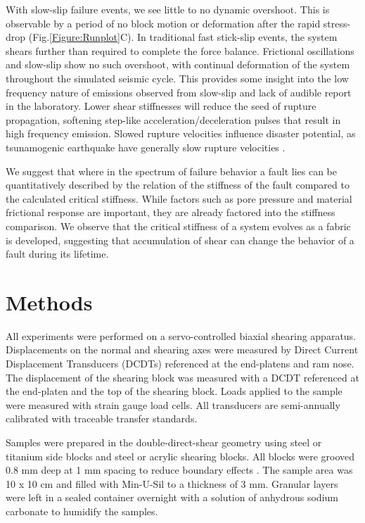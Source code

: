 \documentclass[11pt]{article}
\begin{document}
With slow-slip failure events, we see little to no dynamic overshoot. This is observable by a period of no block motion or
deformation after the rapid stress-drop (Fig.\ref{Figure:Runplot}C).  In
traditional fast stick-slip events, the system shears further than required to
complete the force balance. Frictional oscillations and slow-slip
show no such overshoot, with continual deformation of the system throughout the
simulated seismic cycle. This provides some insight into the low frequency
nature of emissions observed from slow-slip and lack of audible report in the
laboratory. Lower shear stiffnesses will reduce the seed of rupture propagation,
softening step-like acceleration/deceleration pulses that result in high
frequency emission. Slowed rupture velocities influence disaster potential, as
tsunamogenic earthquake have generally slow rupture velocities
\cite{Kanamori:1993, Bilek:1999}.

We suggest that where in the spectrum of failure behavior a fault lies can be
quantitatively described by the relation of the stiffness of the fault compared
to the calculated critical stiffness. While factors such as pore pressure and
material frictional response are important, they are already factored into  the
stiffness comparison. We observe that the critical stiffness of a system evolves
as a fabric is developed, suggesting that accumulation of shear can change the
behavior of a fault during its lifetime.

\section{Methods}
All experiments were performed on a servo-controlled biaxial shearing apparatus.
Displacements on the normal and shearing axes were measured by Direct Current
Displacement Transducers (DCDTs) referenced at the end-platens and ram nose. The
displacement of the shearing block was measured with a DCDT referenced at the
end-platen and the top of the shearing block. Loads applied to the sample were
measured with strain gauge load cells. All transducers are semi-annually
calibrated with traceable transfer standards.

Samples were prepared in the double-direct-shear geometry using steel or
titanium side blocks and steel or acrylic shearing blocks. All blocks were
grooved 0.8 mm deep at 1 mm spacing to reduce boundary effects \cite{Anthony:2005}. The sample area
was 10 x 10 cm and filled with Min-U-Sil to a thickness of 3 mm. Granular layers
were left in a sealed container overnight with a solution of anhydrous sodium
carbonate to humidify the samples.
\end{document}
